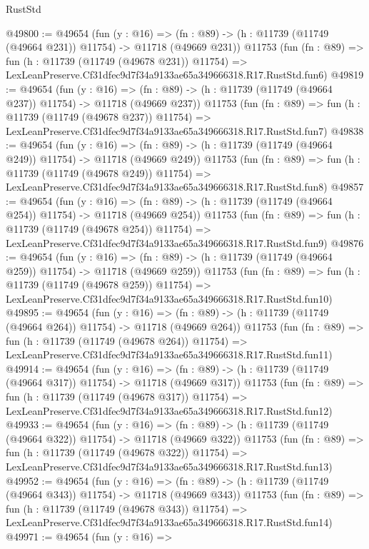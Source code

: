 \begin{lexlean}{RustStd}
\begin{coremodule}
@49800 := @49654
    (fun (y : @16) =>
    (fn : @89) -> (h : @11739 (@11749 (@49664 @231)) @11754) -> @11718 (@49669 @231))
    @11753
    (fun (fn : @89) =>
    fun (h : @11739 (@11749 (@49678 @231)) @11754) =>
    LexLeanPreserve.Cf31dfec9d7f34a9133ae65a349666318.R17.RustStd.fun6)
@49819 := @49654
    (fun (y : @16) =>
    (fn : @89) -> (h : @11739 (@11749 (@49664 @237)) @11754) -> @11718 (@49669 @237))
    @11753
    (fun (fn : @89) =>
    fun (h : @11739 (@11749 (@49678 @237)) @11754) =>
    LexLeanPreserve.Cf31dfec9d7f34a9133ae65a349666318.R17.RustStd.fun7)
@49838 := @49654
    (fun (y : @16) =>
    (fn : @89) -> (h : @11739 (@11749 (@49664 @249)) @11754) -> @11718 (@49669 @249))
    @11753
    (fun (fn : @89) =>
    fun (h : @11739 (@11749 (@49678 @249)) @11754) =>
    LexLeanPreserve.Cf31dfec9d7f34a9133ae65a349666318.R17.RustStd.fun8)
@49857 := @49654
    (fun (y : @16) =>
    (fn : @89) -> (h : @11739 (@11749 (@49664 @254)) @11754) -> @11718 (@49669 @254))
    @11753
    (fun (fn : @89) =>
    fun (h : @11739 (@11749 (@49678 @254)) @11754) =>
    LexLeanPreserve.Cf31dfec9d7f34a9133ae65a349666318.R17.RustStd.fun9)
@49876 := @49654
    (fun (y : @16) =>
    (fn : @89) -> (h : @11739 (@11749 (@49664 @259)) @11754) -> @11718 (@49669 @259))
    @11753
    (fun (fn : @89) =>
    fun (h : @11739 (@11749 (@49678 @259)) @11754) =>
    LexLeanPreserve.Cf31dfec9d7f34a9133ae65a349666318.R17.RustStd.fun10)
@49895 := @49654
    (fun (y : @16) =>
    (fn : @89) -> (h : @11739 (@11749 (@49664 @264)) @11754) -> @11718 (@49669 @264))
    @11753
    (fun (fn : @89) =>
    fun (h : @11739 (@11749 (@49678 @264)) @11754) =>
    LexLeanPreserve.Cf31dfec9d7f34a9133ae65a349666318.R17.RustStd.fun11)
@49914 := @49654
    (fun (y : @16) =>
    (fn : @89) -> (h : @11739 (@11749 (@49664 @317)) @11754) -> @11718 (@49669 @317))
    @11753
    (fun (fn : @89) =>
    fun (h : @11739 (@11749 (@49678 @317)) @11754) =>
    LexLeanPreserve.Cf31dfec9d7f34a9133ae65a349666318.R17.RustStd.fun12)
@49933 := @49654
    (fun (y : @16) =>
    (fn : @89) -> (h : @11739 (@11749 (@49664 @322)) @11754) -> @11718 (@49669 @322))
    @11753
    (fun (fn : @89) =>
    fun (h : @11739 (@11749 (@49678 @322)) @11754) =>
    LexLeanPreserve.Cf31dfec9d7f34a9133ae65a349666318.R17.RustStd.fun13)
@49952 := @49654
    (fun (y : @16) =>
    (fn : @89) -> (h : @11739 (@11749 (@49664 @343)) @11754) -> @11718 (@49669 @343))
    @11753
    (fun (fn : @89) =>
    fun (h : @11739 (@11749 (@49678 @343)) @11754) =>
    LexLeanPreserve.Cf31dfec9d7f34a9133ae65a349666318.R17.RustStd.fun14)
@49971 := @49654
    (fun (y : @16) =>

\end{coremodule}
\end{lexlean}
